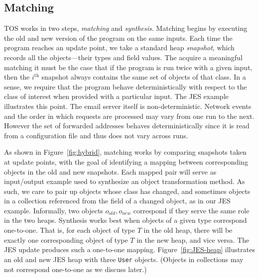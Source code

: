 \documentclass[natbib]{sigplanconf}
\newcommand{\code}[1]{\lstinline|#1|\xspace}
\newcommand{\TOS}{TOS\xspace}
\begin{document}
\subsection{Matching}
\label{sec:matching-overview}


\TOS works in two steps, \emph{matching} and \emph{synthesis}. 
Matching begins by executing the old and new version of the 
program on the same inputs.  Each time the program reaches an update
point, we take a standard heap \emph{snapshot},
which records all the objects---their types and field values.
The acquire a meaningful matching it must
be the case that if the program is run twice with a given input,
then the $i^\text{th}$ snapshot always contains the same set of
objects of that class.  In a sense, we require that the program
behave deterministically with respect to the class of interest
when provided with a particular input.  The JES example illustrates
this point.  The email server itself is non-deterministic.  Network
events and the order in which requests are processed may vary
from one run to the next.  However the set of forwarded addresses
behaves deterministically since it is read from a configuration file
and thus does not vary across runs.

As shown in Figure~\ref{fig:hybrid}, matching works by comparing
snapshots taken at update points, with the goal of
identifying a mapping between corresponding objects in the old and new snapshots.  
Each mapped pair will serve as input/output example used to synthesize
an object transformation method.  As such, we care to pair up objects whose
class has changed, and sometimes objects in a collection referenced
from the field of a changed object, as in our JES example.
Informally, two objects $o_{old},o_{new}$ correspond if they serve the
same role in the two heaps.  Synthesis works best when objects of a given
type correspond one-to-one.  That is, for each object of type $T$ in the
old heap, there will be exactly one corresponding object of type $T$ in the
new heap, and vice versa.   The JES update produces such a one-to-one
mapping.  Figure~\ref{fig:JES-heap} illustrates an old and new JES
heap with three \code{User} objects. (Objects in collections may not
correspond one-to-one as we discuss later.)
\end{document}
